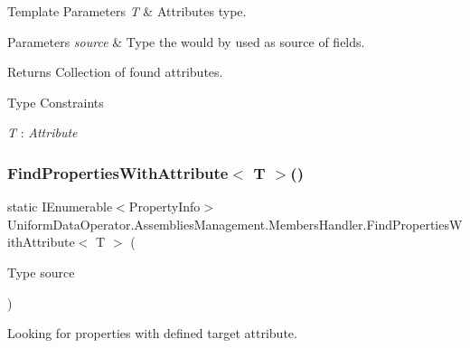 \begin{DoxyTemplParams}{Template Parameters}
{\em T} & Attribute\textquotesingle{}s type.\\
\hline
\end{DoxyTemplParams}

\begin{DoxyParams}{Parameters}
{\em source} & Type the would by used as source of fields.\\
\hline
\end{DoxyParams}
\begin{DoxyReturn}{Returns}
Collection of found attributes.
\end{DoxyReturn}
\begin{Desc}
\item[Type Constraints]\begin{description}
\item[{\em T} : {\em Attribute}]\end{description}
\end{Desc}
\mbox{\label{class_uniform_data_operator_1_1_assemblies_management_1_1_members_handler_af18869106319a1b9b0473a817a3c1964}} 
\subsubsection{\texorpdfstring{Find\+Properties\+With\+Attribute$<$ T $>$()}{FindPropertiesWithAttribute< T >()}}
{\footnotesize\ttfamily static I\+Enumerable$<$Property\+Info$>$ Uniform\+Data\+Operator.\+Assemblies\+Management.\+Members\+Handler.\+Find\+Properties\+With\+Attribute$<$ T $>$ (\begin{DoxyParamCaption}\item[{Type}]{source }\end{DoxyParamCaption})\hspace{0.3cm}{\ttfamily [static]}}



Looking for properties with defined target attribute. 


